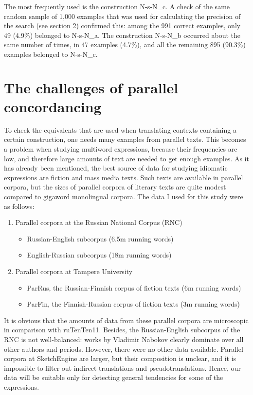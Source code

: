 \documentclass[output=paper]{langscibook}
\begin{document}
The most frequently used is the construction N-s-N\_c. A check of the same random sample of 1,000 examples that was used for calculating the precision of the search (see section 2) confirmed this: among the 991 correct examples, only 49 (4.9\%) belonged to N-s-N\_a. The construction N-s-N\_b occurred about the same number of times, in 47 examples (4.7\%), and all the remaining 895 (90.3\%) examples belonged to N-s-N\_c.

\section{The challenges of parallel concordancing}
\largerpage
To check the equivalents that are used when translating contexts containing a certain construction, one needs many examples from parallel texts. This becomes a problem when studying multiword expressions, because their frequencies are low, and therefore large amounts of text are needed to get enough examples. As it has already been mentioned, the best source of data for studying idiomatic expressions are fiction and mass media texts. Such texts are available in parallel corpora, but the sizes of parallel corpora of literary texts are quite modest compared to gigaword monolingual corpora. The data I used for this study were as follows:

\begin{enumerate}
\item  Parallel corpora at the Russian National Corpus (RNC)
\begin{itemize}
\item Russian-English subcorpus (6.5m running words)
\item English-Russian subcorpus (18m running words)
\end{itemize}
\item Parallel corpora at Tampere University
\begin{itemize}\sloppy
\item ParRus, the Russian-Finnish corpus of fiction texts (6m running words)
\item ParFin, the Finnish-Russian corpus of fiction texts (3m running words)
\end{itemize}
\end{enumerate}

It is obvious that the amounts of data from these parallel corpora are microscopic in comparison with ruTenTen11. Besides, the Russian-English subcorpus of the RNC is not well-balanced: works by Vladimir Nabokov clearly dominate over all other authors and periods. However, there were no other data available. Parallel corpora at SketchEngine are larger, but their composition is unclear, and it is impossible to filter out indirect translations and pseudotranslations. Hence, our data will be suitable only for detecting general tendencies for some of the expressions.
\end{document}

